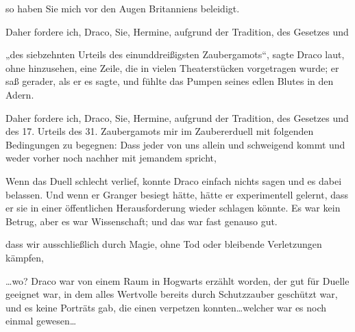 \begin{writtenNote}
so haben Sie mich vor den Augen Britanniens beleidigt.

Daher fordere ich, Draco, Sie, Hermine, aufgrund der Tradition, des Gesetzes und
\end{writtenNote}

„des siebzehnten Urteils des einunddreißigsten Zaubergamots“, sagte Draco laut, ohne hinzusehen, eine Zeile, die in vielen Theaterstücken vorgetragen wurde; er saß gerader, als er es sagte, und fühlte das Pumpen seines edlen Blutes in den Adern.

\begin{writtenNote}
Daher fordere ich, Draco, Sie, Hermine, aufgrund der Tradition, des Gesetzes und des 17. Urteils des 31. Zaubergamots mir im Zaubererduell mit folgenden Bedingungen zu begegnen: Dass jeder von uns allein und schweigend kommt und weder vorher noch nachher mit jemandem spricht,
\end{writtenNote}

Wenn das Duell schlecht verlief, konnte Draco einfach nichts sagen und es dabei belassen. Und wenn er Granger besiegt hätte, hätte er experimentell gelernt, dass er sie in einer öffentlichen Herausforderung wieder schlagen könnte. Es war kein Betrug, aber es war Wissenschaft; und das war fast genauso gut.

\begin{writtenNote}
dass wir ausschließlich durch Magie, ohne Tod oder bleibende Verletzungen kämpfen,
\end{writtenNote}

…wo? Draco war von einem Raum in Hogwarts erzählt worden, der gut für Duelle geeignet war, in dem alles Wertvolle bereits durch Schutzzauber geschützt war, und es keine Porträts gab, die einen verpetzen konnten…welcher war es noch einmal gewesen…

